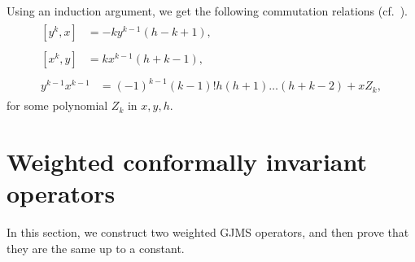 \documentclass{amsart}
\begin{document}
Using an induction argument, we get the following commutation relations (cf.\ \cites{GJMS1992}).
\begin{subequations}
\begin{align}
\begin{split}
\label{liebracket1}
[y^k,x]&=-ky^{k-1}(h-k+1),
\end{split}\\
\begin{split}
\label{liebracket2}
[x^k,y]&=kx^{k-1}(h+k-1),
\end{split}\\
\begin{split}
\label{liebracket3}
y^{k-1}x^{k-1}&=(-1)^{k-1}(k-1)!h(h+1)\dots (h+k-2)+xZ_k,
\end{split}
\end{align}
\end{subequations} for some polynomial $Z_k$ in $x,y,h$.

\section{Weighted conformally invariant operators}
\label{sec:wcio}
In this section, we construct two weighted GJMS operators, and then prove that they are the same up to a constant.
\end{document}
